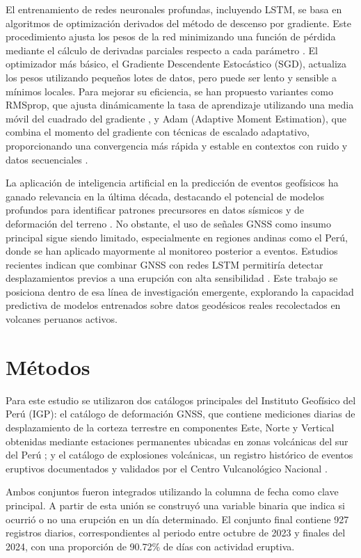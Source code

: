 \documentclass[conference]{IEEEtran}
\begin{document}
El entrenamiento de redes neuronales profundas, incluyendo LSTM, se basa en algoritmos de optimización derivados del método de descenso por gradiente. Este procedimiento ajusta los pesos de la red minimizando una función de pérdida mediante el cálculo de derivadas parciales respecto a cada parámetro \cite{b8}. El optimizador más básico, el Gradiente Descendente Estocástico (SGD), actualiza los pesos utilizando pequeños lotes de datos, pero puede ser lento y sensible a mínimos locales. Para mejorar su eficiencia, se han propuesto variantes como RMSprop, que ajusta dinámicamente la tasa de aprendizaje utilizando una media móvil del cuadrado del gradiente \cite{b9}, y Adam (Adaptive Moment Estimation), que combina el momento del gradiente con técnicas de escalado adaptativo, proporcionando una convergencia más rápida y estable en contextos con ruido y datos secuenciales \cite{b10}.

La aplicación de inteligencia artificial en la predicción de eventos geofísicos ha ganado relevancia en la última década, destacando el potencial de modelos profundos para identificar patrones precursores en datos sísmicos y de deformación del terreno \cite{b11}. No obstante, el uso de señales GNSS como insumo principal sigue siendo limitado, especialmente en regiones andinas como el Perú, donde se han aplicado mayormente al monitoreo posterior a eventos. Estudios recientes indican que combinar GNSS con redes LSTM permitiría detectar desplazamientos previos a una erupción con alta sensibilidad \cite{b12}. Este trabajo se posiciona dentro de esa línea de investigación emergente, explorando la capacidad predictiva de modelos entrenados sobre datos geodésicos reales recolectados en volcanes peruanos activos.



\section{Métodos}

Para este estudio se utilizaron dos catálogos principales del Instituto Geofísico del Perú (IGP): el catálogo de deformación GNSS, que contiene mediciones diarias de desplazamiento de la corteza terrestre en componentes Este, Norte y Vertical obtenidas mediante estaciones permanentes ubicadas en zonas volcánicas del sur del Perú \cite{b13}; y el catálogo de explosiones volcánicas, un registro histórico de eventos eruptivos documentados y validados por el Centro Vulcanológico Nacional \cite{b14}.

Ambos conjuntos fueron integrados utilizando la columna de fecha como clave principal. A partir de esta unión se construyó una variable binaria que indica si ocurrió o no una erupción en un día determinado. El conjunto final contiene 927 registros diarios, correspondientes al periodo entre octubre de 2023 y finales del 2024, con una proporción de 90.72\% de días con actividad eruptiva.
\end{document}
